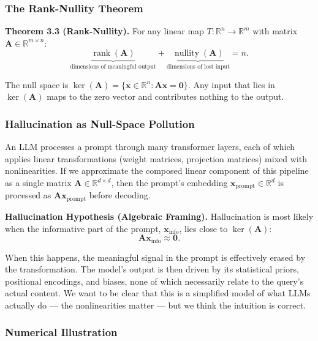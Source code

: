 \documentclass[12pt,a4paper]{article}
\begin{document}
\subsubsection{The Rank-Nullity Theorem}

\textbf{Theorem 3.3 (Rank-Nullity).} For any linear map
$T : \mathbb{R}^n \to \mathbb{R}^m$ with matrix $\mathbf{A} \in \mathbb{R}^{m \times n}$:
\begin{equation}
    \underbrace{\operatorname{rank}(\mathbf{A})}_{\text{dimensions of meaningful output}}
    +
    \underbrace{\operatorname{nullity}(\mathbf{A})}_{\text{dimensions of lost input}}
    = n.
\end{equation}

The null space is $\ker(\mathbf{A}) = \{\mathbf{x} \in \mathbb{R}^n : \mathbf{A}\mathbf{x} = \mathbf{0}\}$.
Any input that lies in $\ker(\mathbf{A})$ maps to the zero vector and contributes nothing
to the output.

\subsubsection{Hallucination as Null-Space Pollution}

An LLM processes a prompt through many transformer layers, each of which applies linear
transformations (weight matrices, projection matrices) mixed with nonlinearities. If we
approximate the composed linear component of this pipeline as a single matrix
$\mathbf{A} \in \mathbb{R}^{d \times d}$, then the prompt's embedding
$\mathbf{x}_{\text{prompt}} \in \mathbb{R}^d$ is processed as $\mathbf{A}\mathbf{x}_{\text{prompt}}$
before decoding.

\textbf{Hallucination Hypothesis (Algebraic Framing).} Hallucination is most likely when
the informative part of the prompt, $\mathbf{x}_{\text{info}}$, lies close to $\ker(\mathbf{A})$:
\begin{equation}
    \mathbf{A}\mathbf{x}_{\text{info}} \approx \mathbf{0}.
\end{equation}

When this happens, the meaningful signal in the prompt is effectively erased by the
transformation. The model's output is then driven by its statistical priors, positional
encodings, and biases, none of which necessarily relate to the query's actual content.
We want to be clear that this is a simplified model of what LLMs actually do --- the
nonlinearities matter --- but we think the intuition is correct.

\subsubsection{Numerical Illustration}
\end{document}
